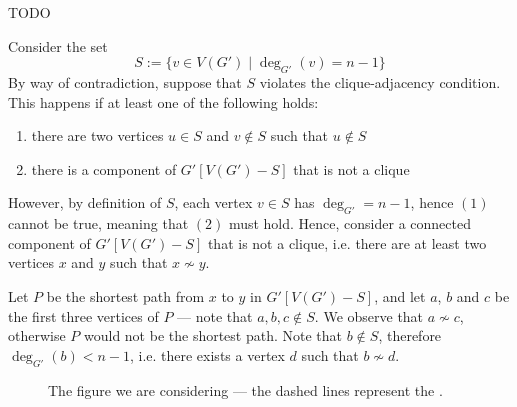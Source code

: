 \documentclass[a4paper, 12pt]{report}
\begin{document}
{{            %
            TODO 
        }

        Consider the set $$S := \{v \in V(G') \mid \deg_{G'}(v) = n - 1\}$$ By way of contradiction, suppose that $S$ violates the clique-adjacency condition. This happens if at least one of the following holds:

        \begin{enumerate}[label={(\arabic*)}]
            \item there are two vertices $u \in S$ and $v \notin S$ such that $u \notin S$
            \item there is a component of $G'[V(G') - S]$ that is not a clique
        \end{enumerate}

        However, by definition of $S$, each vertex $v \in S$ has $\deg_{G'} = n - 1$, hence $(1)$ cannot be true, meaning that $(2)$ must hold. Hence, consider a connected component of $G'[V(G') - S]$ that is not a clique, i.e. there are at least two vertices $x$ and $y$ such that $x \nsim y$.

        Let $P$ be the shortest path from $x$ to $y$ in $G'[V(G') - S]$, and let $a$, $b$ and $c$ be the first three vertices of $P$ --- note that $a, b, c \notin S$. We observe that $a \nsim c$, otherwise $P$ would not be the shortest path. Note that $b \notin S$, therefore $\deg_{G'}(b) < n - 1$, i.e. there exists a vertex $d$ such that $b \nsim d$.

        \begin{figure}[H]
            \centering
            \caption{The  figure we are considering --- the dashed lines represent the .}
        \end{figure}

}
\end{document}
